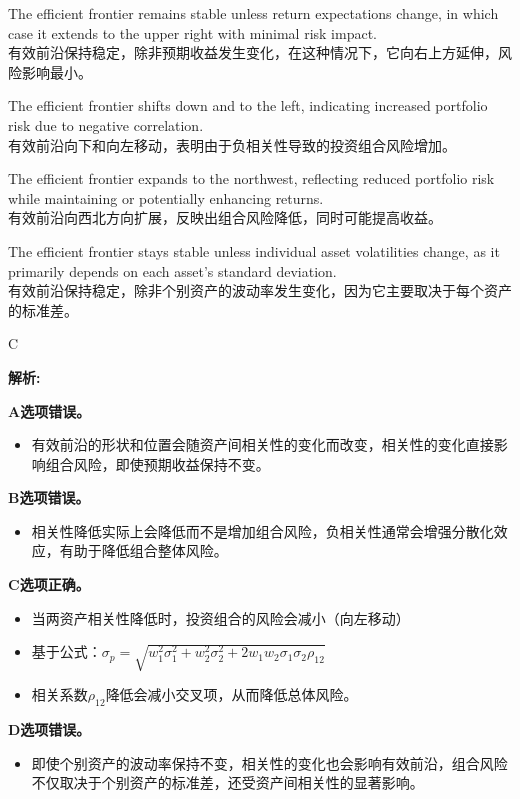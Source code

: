 \documentclass{article}
\newenvironment{explanation}
{\textbf{解析:}\par}
{\par}
\begin{document}
\begin{choices}
    \item The efficient frontier remains stable unless return expectations change, in which case it extends to the upper right with minimal risk impact.\\
    有效前沿保持稳定，除非预期收益发生变化，在这种情况下，它向右上方延伸，风险影响最小。
    \item The efficient frontier shifts down and to the left, indicating increased portfolio risk due to negative correlation.\\
    有效前沿向下和向左移动，表明由于负相关性导致的投资组合风险增加。
    \item The efficient frontier expands to the northwest, reflecting reduced portfolio risk while maintaining or potentially enhancing returns.\\
    有效前沿向西北方向扩展，反映出组合风险降低，同时可能提高收益。
    \item The efficient frontier stays stable unless individual asset volatilities change, as it primarily depends on each asset's standard deviation.\\
    有效前沿保持稳定，除非个别资产的波动率发生变化，因为它主要取决于每个资产的标准差。
\end{choices}

\begin{correctanswer}
    C
\end{correctanswer}

\begin{explanation}
    \textbf{A选项错误。}
    \begin{itemize}
        \item 有效前沿的形状和位置会随资产间相关性的变化而改变，相关性的变化直接影响组合风险，即使预期收益保持不变。
    \end{itemize}

    \textbf{B选项错误。}
    \begin{itemize}
        \item 相关性降低实际上会降低而不是增加组合风险，负相关性通常会增强分散化效应，有助于降低组合整体风险。
    \end{itemize}

    \textbf{C选项正确。}
    \begin{itemize}
        \item 当两资产相关性降低时，投资组合的风险会减小（向左移动）
        \item 基于公式：$\sigma_p = \sqrt{w_1^2\sigma_1^2 + w_2^2\sigma_2^2 + 2w_1w_2\sigma_1\sigma_2\rho_{12}}$
        \item 相关系数$\rho_{12}$降低会减小交叉项，从而降低总体风险。
    \end{itemize}

    \textbf{D选项错误。}
    \begin{itemize}
        \item 即使个别资产的波动率保持不变，相关性的变化也会影响有效前沿，组合风险不仅取决于个别资产的标准差，还受资产间相关性的显著影响。
    \end{itemize}
\end{explanation}
\end{document}
